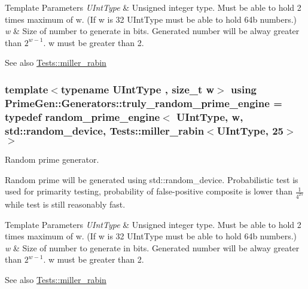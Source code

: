 \begin{DoxyTemplParams}{Template Parameters}
{\em U\+Int\+Type} & Unsigned integer type. Must be able to hold 2 times maximum of {\ttfamily w}. (If {\ttfamily w} is 32 {\ttfamily U\+Int\+Type} must be able to hold 64b numbers.)\\
\hline
{\em w} & Size of number to generate in bits. Generated number will be alway greater than $ 2^{w-1} $. {\ttfamily w} must be greater than 2.\\
\hline
\end{DoxyTemplParams}
\begin{DoxySeeAlso}{See also}
\hyperlink{namespace_prime_gen_1_1_tests_ab4ab789bde1badebff58de914a31afb3}{Tests\+::miller\+\_\+rabin} 
\end{DoxySeeAlso}
\hypertarget{namespace_prime_gen_1_1_generators_ab2949ed1231e1fe0166367456a32a746}{
\subsubsection[{truly\+\_\+random\+\_\+prime\+\_\+engine}]{\setlength{\rightskip}{0pt plus 5cm}template$<$typename U\+Int\+Type , size\+\_\+t w$>$ using {\bf Prime\+Gen\+::\+Generators\+::truly\+\_\+random\+\_\+prime\+\_\+engine} = typedef {\bf random\+\_\+prime\+\_\+engine}$<$ U\+Int\+Type, w, std\+::random\+\_\+device, {\bf Tests\+::miller\+\_\+rabin}$<$U\+Int\+Type, 25$>$ $>$}}\label{namespace_prime_gen_1_1_generators_ab2949ed1231e1fe0166367456a32a746}


Random prime generator. 

Random prime will be generated using {\ttfamily std\+::random\+\_\+device}. Probabilistic test is used for primarity testing, probability of false-\/positive composite is lower than $ \frac{1}{4^{25}} $ while test is still reasonably fast.


\begin{DoxyTemplParams}{Template Parameters}
{\em U\+Int\+Type} & Unsigned integer type. Must be able to hold 2 times maximum of {\ttfamily w}. (If {\ttfamily w} is 32 {\ttfamily U\+Int\+Type} must be able to hold 64b numbers.)\\
\hline
{\em w} & Size of number to generate in bits. Generated number will be alway greater than $ 2^{w-1} $. {\ttfamily w} must be greater than 2.\\
\hline
\end{DoxyTemplParams}
\begin{DoxySeeAlso}{See also}
\hyperlink{namespace_prime_gen_1_1_tests_ab4ab789bde1badebff58de914a31afb3}{Tests\+::miller\+\_\+rabin} 
\end{DoxySeeAlso}


